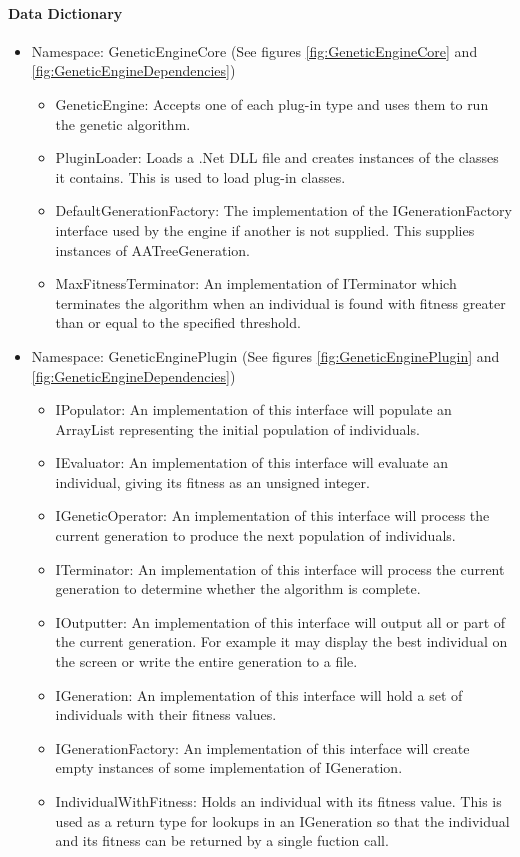 \paragraph{Data Dictionary}
\begin{itemize}
\item Namespace: GeneticEngineCore (See figures \ref{fig:GeneticEngineCore} and \ref{fig:GeneticEngineDependencies})
	\begin{itemize}
	\item GeneticEngine: Accepts one of each plug-in type and uses them to run the genetic algorithm.
	\item PluginLoader: Loads a .Net DLL file and creates instances of the classes it contains. This is used to load plug-in classes.
	\item DefaultGenerationFactory: The implementation of the IGenerationFactory interface used by the engine if another is not supplied. This supplies instances of AATreeGeneration.
	\item MaxFitnessTerminator: An implementation of ITerminator which terminates the algorithm when an individual is found with fitness greater than or equal to the specified threshold.
	\end{itemize}
	
\item Namespace: GeneticEnginePlugin (See figures \ref{fig:GeneticEnginePlugin} and \ref{fig:GeneticEngineDependencies})
	\begin{itemize}
	\item IPopulator: An implementation of this interface will populate an ArrayList representing the initial population of individuals.
	\item IEvaluator: An implementation of this interface will evaluate an individual, giving its fitness as an unsigned integer.
	\item IGeneticOperator: An implementation of this interface will process the current generation to produce the next population of individuals.
	\item ITerminator: An implementation of this interface will  process the current generation to determine whether the algorithm is complete.
	\item IOutputter: An implementation of this interface will  output all or part of the current generation. For example it may display the best individual on the screen or write the entire generation to a file.
	\item IGeneration: An implementation of this interface will hold a set of individuals with their fitness values.
	\item IGenerationFactory: An implementation of this interface will create empty instances of some implementation of IGeneration.
	\item IndividualWithFitness: Holds an individual with its fitness value. This is used as a return type for lookups in an IGeneration so that the individual and its fitness can be returned by a single fuction call.
	\end{itemize}
	

\end{itemize}
